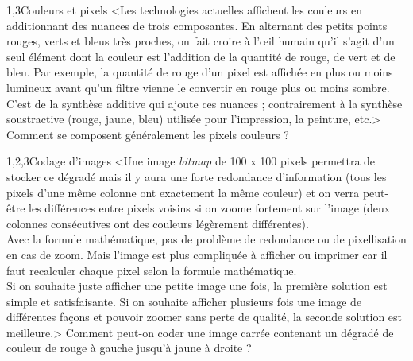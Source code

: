 \begin{quiz}[title={Infographie et audionumérique}]
\vspace{-\baselineskip}
\begin{quizquestion*}[b]{2}{1,3}{Couleurs et pixels}
<Les technologies actuelles affichent les couleurs en additionnant des nuances de trois composantes. En alternant des petits points rouges, verts et bleus très proches, on fait croire à l’œil humain qu'il s'agit d'un seul élément dont la couleur est l'addition de la quantité de rouge, de vert et de bleu. Par exemple, la quantité de rouge d'un pixel est affichée en plus ou moins lumineux avant qu'un filtre vienne le convertir en rouge plus ou moins sombre.
C'est de la synthèse additive qui ajoute ces nuances ; contrairement à la synthèse soustractive (rouge, jaune, bleu) utilisée pour l'impression, la peinture, etc.>
Comment se composent généralement les pixels couleurs ?
\end{quizquestion*}

\begin{quizquestion}[c]{1,2,3}{}{Codage d'images}
<Une image \textit{bitmap} de 100 x 100 pixels permettra de stocker ce dégradé mais il y aura une forte redondance d'information (tous les pixels d'une même colonne ont exactement la même couleur) et on verra peut-être les différences entre pixels voisins si on zoome fortement sur l'image (deux colonnes consécutives ont des couleurs légèrement différentes).\\
Avec la formule mathématique, pas de problème de redondance ou de pixellisation en cas de zoom. Mais l'image est plus compliquée à afficher ou imprimer car il faut recalculer chaque pixel selon la formule mathématique.\\
Si on souhaite juste afficher une petite image une fois, la première solution est simple et satisfaisante. Si on souhaite afficher plusieurs fois une image de différentes façons et pouvoir zoomer sans perte de qualité, la seconde solution est meilleure.>
Comment peut-on coder une image carrée contenant un dégradé de couleur de rouge à gauche jusqu'à jaune à droite ?
\end{quizquestion}


\end{quiz}
